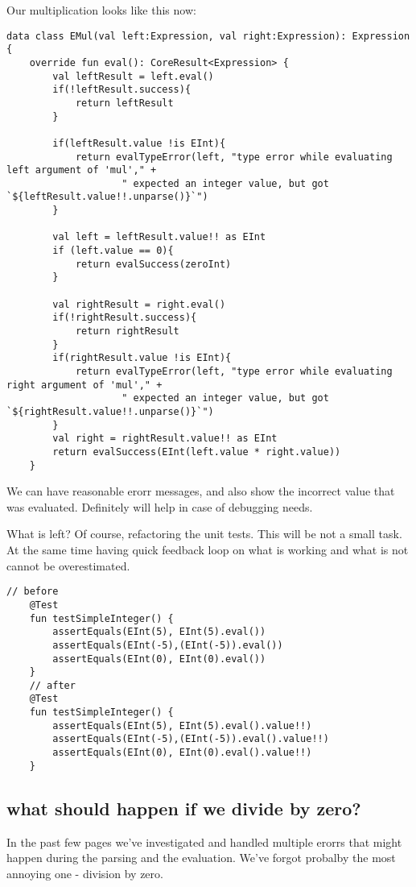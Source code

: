 \documentclass[11pt]{article}
\begin{document}
Our multiplication looks like this now:
\begin{verbatim}
data class EMul(val left:Expression, val right:Expression): Expression {
    override fun eval(): CoreResult<Expression> {
        val leftResult = left.eval()
        if(!leftResult.success){
            return leftResult
        }

        if(leftResult.value !is EInt){
            return evalTypeError(left, "type error while evaluating left argument of 'mul'," +
                    " expected an integer value, but got `${leftResult.value!!.unparse()}`")
        }

        val left = leftResult.value!! as EInt
        if (left.value == 0){
            return evalSuccess(zeroInt)
        }

        val rightResult = right.eval()
        if(!rightResult.success){
            return rightResult
        }
        if(rightResult.value !is EInt){
            return evalTypeError(left, "type error while evaluating right argument of 'mul'," +
                    " expected an integer value, but got `${rightResult.value!!.unparse()}`")
        }
        val right = rightResult.value!! as EInt
        return evalSuccess(EInt(left.value * right.value))
    }
\end{verbatim}

We can have reasonable erorr messages, and also show the incorrect value that was evaluated.
Definitely will help in case of debugging needs.

What is left? Of course, refactoring the unit tests. This will be not a small task. At the same time having quick feedback loop on what is working and what is not cannot be overestimated.


\begin{verbatim}
// before
    @Test
    fun testSimpleInteger() {
        assertEquals(EInt(5), EInt(5).eval())
        assertEquals(EInt(-5),(EInt(-5)).eval())
        assertEquals(EInt(0), EInt(0).eval())
    }
    // after
    @Test
    fun testSimpleInteger() {
        assertEquals(EInt(5), EInt(5).eval().value!!)
        assertEquals(EInt(-5),(EInt(-5)).eval().value!!)
        assertEquals(EInt(0), EInt(0).eval().value!!)
    }
\end{verbatim}

\subsection{what should happen if we divide by zero?}
\label{sec:orgf5894bc}
In the past few pages we've investigated and handled multiple erorrs that might happen during the parsing and the evaluation. We've forgot probalby the most annoying one - division by zero.
\end{document}
